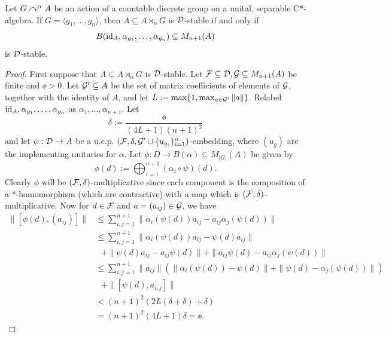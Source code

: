 \documentclass[12pt]{amsart}
\begin{document}
    \begin{prop}\label{diagonalinclusion}
        Let $G \curvearrowright^\alpha A$ be an action of a countable discrete group on a unital, separable C*-algebra. If $G = \langle g_1,\dots,g_n\rangle$, then $A \subseteq A \rtimes_\alpha G$ is $\mathcal{D}$-stable if and only if
\begin{equation}
        B(\text{id}_A,\alpha_{g_1},\dots,\alpha_{g_n}) \subseteq M_{n+1}(A)
\end{equation}
        is $\mathcal{D}$-stable.
          \begin{proof}
            First suppose that $A \subseteq A \rtimes_\alpha G$ is $\mathcal{D}$-stable. Let $\mathcal{F} \subseteq \mathcal{D}, \mathcal{G} \subseteq M_{n+1}(A)$ be finite and $\ee > 0$. Let $\mathcal{G}' \subseteq A$ be the set of matrix coefficients of elements of $\mathcal{G}$, together with the identity of $A$, and let $L := \max\{1,\max_{a \in \mathcal{G}'}\|a\|\}$. Relabel $\text{id}_A,\alpha_{g_1},\dots,\alpha_{g_n}$ as $\alpha_1,\dots,\alpha_{n+1}$. Let
\begin{equation}
            \delta := \frac{\ee}{(4L+1)(n+1)^2}
\end{equation}
            and let $\psi: \mathcal{D} \to A$ be a u.c.p. $(\mathcal{F},\delta,\mathcal{G}' \cup\{u_{g_i}\}_{i=1}^n)$-embedding, where $(u_g)$ are the implementing unitaries for $\alpha$. Let $\phi: D \to B(\alpha) \subseteq M_{|G|}(A)$ be given by
            \begin{equation}
            \phi(d) := \bigoplus_{i=1}^{n+1} (\alpha_i \circ \psi)(d).
            \end{equation}
            Clearly $\phi$ will be $(\mathcal{F},\delta)$-multiplicative since each component is the composition of a *-homomorphism (which are contractive) with a map which is $(\mathcal{F},\delta)$-multiplicative. Now for $d \in \mathcal{F}$ and $a = (a_{ij}) \in \mathcal{G}$, we have
\begin{equation}
\begin{split}                \|[\phi(d),(a_{ij})]\| &\leq \sum_{i,j=1}^{n+1}\|\alpha_i(\psi(d))a_{ij} - a_{ij}\alpha_j(\psi(d))\| \\
                                       &\leq \sum_{i,j=1}^{n+1}\| \alpha_i(\psi(d))a_{ij} - \psi(d)a_{ij}\| \\
                                       &\ \ \ + \|\psi(d)a_{ij} - a_{ij}\psi(d)\| + \|a_{ij}\psi(d) - a_{ij}\alpha_j(\psi(d))\| \\
                                       &\leq \sum_{i,j=1}^{n+1}\|a_{ij}\|\left(\|\alpha_i(\psi(d)) - \psi(d)\| + \|\psi(d) - \alpha_j(\psi(d))\|\right) \\
                                       &\ \ \  + \|[\psi(d),a_{i,j}]\| \\
                                       &< (n+1)^2(2L(\delta + \delta) + \delta) \\
                                       &= (n+1)^2(4L+1)\delta = \ee.
\end{split}
\end{equation}


\end{proof}
\end{prop}
\end{document}
